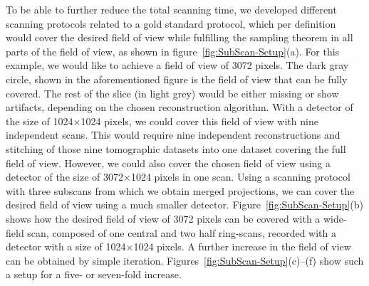 To be able to further reduce the total scanning time, we developed different scanning protocols related to a gold standard protocol, which per definition would cover the desired field of view while fulfilling the sampling theorem in all parts of the field of view, as shown in figure~\ref{fig:SubScan-Setup}(a). For this example, we would like to achieve a field of view of 3072 pixels. The dark gray circle, shown in the aforementioned figure is the field of view that can be fully covered. The rest of the slice (in light grey) would be either missing or show artifacts, depending on the chosen reconstruction algorithm. With a detector of the size of 1024$\times$1024 pixels, we could cover this field of view with nine independent scans. This would require nine independent reconstructions and stitching of those nine tomographic datasets into one dataset covering the full field of view. However, we could also cover the chosen field of view using a detector of the size of 3072$\times$1024 pixels in one scan. Using a scanning protocol with three subscans from which we obtain merged projections, we can cover the desired field of view using a much smaller detector. Figure~\ref{fig:SubScan-Setup}(b) shows how the desired field of view of 3072 pixels can be covered with a wide-field scan, composed of one central and two half ring-scans, recorded with a detector with a size of 1024$\times$1024 pixels. A further increase in the field of view can be obtained by simple iteration. Figures~\ref{fig:SubScan-Setup}(c)--(f) show such a setup for a five- or seven-fold increase.

